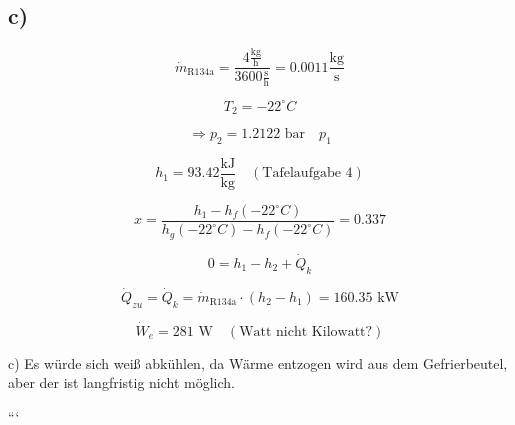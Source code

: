

\subsection*{c)}

\[
\dot{m}_{\text{R134a}} = \frac{4 \frac{\text{kg}}{\text{h}}}{3600 \frac{\text{s}}{\text{h}}} = 0.0011 \frac{\text{kg}}{\text{s}}
\]

\[
T_2 = -22^\circ C
\]

\[
\Rightarrow p_2 = 1.2122 \text{ bar} \quad p_1
\]

\[
h_1 = 93.42 \frac{\text{kJ}}{\text{kg}} \quad (\text{Tafelaufgabe 4})
\]

\[
x = \frac{h_1 - h_f(-22^\circ C)}{h_g(-22^\circ C) - h_f(-22^\circ C)} = 0.337
\]

\[
0 = h_1 - h_2 + \dot{Q}_k
\]

\[
\dot{Q}_{zu} = \dot{Q}_k = \dot{m}_{\text{R134a}} \cdot (h_2 - h_1) = 160.35 \text{ kW}
\]

\[
\dot{W}_e = 281 \text{ W} \quad (\text{Watt nicht Kilowatt?})
\]

c) Es würde sich weiß abkühlen, da Wärme entzogen wird aus dem Gefrierbeutel, aber der ist langfristig nicht möglich.

```